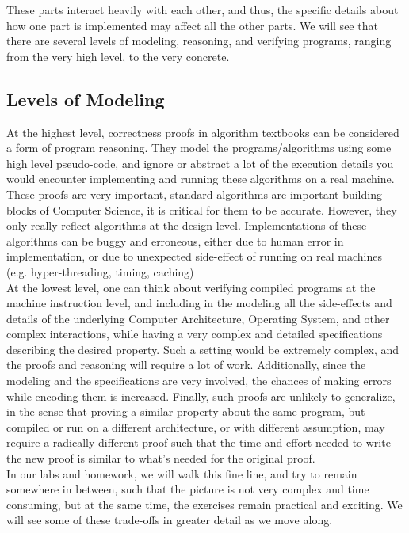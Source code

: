 \documentclass{article}
\begin{document}
These parts interact heavily with each other, and thus, the specific details about how one part is
implemented may affect all the other parts. We will see that there are several levels of modeling,
reasoning, and verifying programs, ranging from the very high level, to the very concrete.

\subsection{Levels of Modeling}

At the highest level, correctness proofs in algorithm textbooks can be considered a form of
program reasoning. They model the programs/algorithms using some high level pseudo-code, and ignore
or abstract a lot of the execution details you would encounter implementing and running these algorithms
on a real machine. These proofs are very important, standard algorithms are important building blocks
of Computer Science, it is critical for them to be accurate. However, they only really reflect algorithms
at the design level. Implementations of these algorithms can be buggy and erroneous, either due to human
error in implementation, or due to unexpected side-effect of running on real machines (e.g. hyper-threading, 
timing, caching) \\

At the lowest level, one can think about verifying compiled programs at the machine instruction level,
and including in the modeling all the side-effects and details of the underlying Computer Architecture, Operating System,
and other complex interactions, while having a very complex and detailed specifications describing the desired property.
Such a setting would be extremely complex, and the proofs and reasoning will require a lot of work. Additionally, since
the modeling and the specifications are very involved, the chances of making errors while encoding them is increased.
Finally, such proofs are unlikely to generalize, in the sense that proving a similar property about the same program,
but compiled or run on a different architecture, or with different assumption, may require a radically different proof
such that the time and effort needed to write the new proof is similar to what's needed for the original proof. \\

In our labs and homework, we will walk this fine line, and try to remain somewhere in between, such that the picture
is not very complex and time consuming, but at the same time, the exercises remain practical and exciting. We will see
some of these trade-offs in greater detail as we move along.
\end{document}
